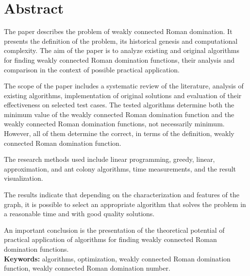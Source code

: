 \chapter*{Abstract}
The paper describes the problem of weakly connected Roman domination. It presents the definition of the problem, its historical genesis and computational complexity. The aim of the paper is to analyze existing and original algorithms for finding weakly connected Roman domination functions, their analysis and comparison in the context of possible practical application.

The scope of the paper includes a systematic review of the literature, analysis of existing algorithms, implementation of original solutions and evaluation of their effectiveness on selected test cases. The tested algorithms determine both the minimum value of the weakly connected Roman domination function and the weakly connected Roman domination functions, not necessarily minimum. However, all of them determine the correct, in terms of the definition, weakly connected Roman domination function.

The research methods used include linear programming, greedy, linear, approximation, and ant colony algorithms, time measurements, and the result visualization.

The results indicate that depending on the characterization and features of the graph, it is possible to select an appropriate algorithm that solves the problem in a reasonable time and with good quality solutions.

An important conclusion is the presentation of the theoretical potential of practical application of algorithms for finding weakly connected Roman domination functions.\\

\textbf{Keywords:} algorithms, optimization, weakly connected Roman domination function, weakly connected Roman domination number.
